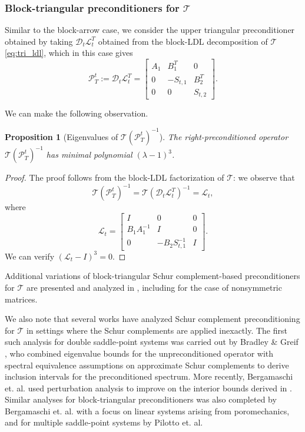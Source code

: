 \documentclass{article}
\newtheorem{proposition}{Proposition}
\newcommand{\sT}{\mathcal{T}}
\begin{document}
\subsubsection{Block-triangular preconditioners for $\sT$}

Similar to the block-arrow case, we consider the upper triangular preconditioner obtained by taking $\mathcal{D}_t\mathcal{L}_t^T$ obtained from the block-LDL decomposition of $\sT$ \eqref{eq:tri_ldl}, which in this case gives
\begin{equation}
    \mathcal{P}_T^t := \mathcal{D}_t\mathcal{L}_t^T = \begin{bmatrix}
        A_1 & B_1^T & 0 \\
        0 & -S_{t,1} & B_2^T \\
        0 & 0 & S_{t,2}
    \end{bmatrix}.
\end{equation}

We can make the following observation.

\begin{proposition}[Eigenvalues of $ \sT (\mathcal{P}_T^t)^{-1}$]
    The right-preconditioned operator  $ \sT (\mathcal{P}_T^t)^{-1}$  has minimal polynomial $(\lambda - 1)^3$.  
\end{proposition}

\begin{proof}
The proof follows from the block-LDL factorization of $\sT$: we observe that 
\[
\sT  (\mathcal{P}_T^t)^{-1} = \sT (\mathcal{D}_t\mathcal{L}_t^T)^{-1} = \mathcal{L}_t,
\]
where
\[
\mathcal{L}_t = \begin{bmatrix}
    I & 0 & 0 \\
    B_1A_1^{-1} & I & 0 \\
    0 & -B_2 S_{t,1}^{-1} & I
\end{bmatrix}.
\]
We can verify  $(\mathcal{L}_t - I)^3 = 0$.
\end{proof}

Additional variations of block-triangular Schur complement-based preconditioners for $\sT$ are presented and analyzed in \cite{cjl21}, including for the case of nonsymmetric matrices. 

We also note that several works have analyzed Schur complement preconditioning for $\sT$ in settings where the Schur complements are applied inexactly. The first such analysis for double saddle‑point systems was carried out by Bradley \& Greif \cite{bg22}, who combined eigenvalue bounds for the unpreconditioned operator with spectral equivalence assumptions on approximate Schur complements to derive inclusion intervals for the preconditioned spectrum. More recently, Bergamaschi et. al. \cite{bmpp25} used perturbation analysis to improve on the interior bounds derived in \cite{bg22}. Similar analyses for block-triangular preconditioners was also completed by Bergamaschi et. al. \cite{bfm25} with a focus on linear systems arising from poromechanics, and for multiple saddle-point systems by Pilotto et. al. \cite{pbm26}
\end{document}
